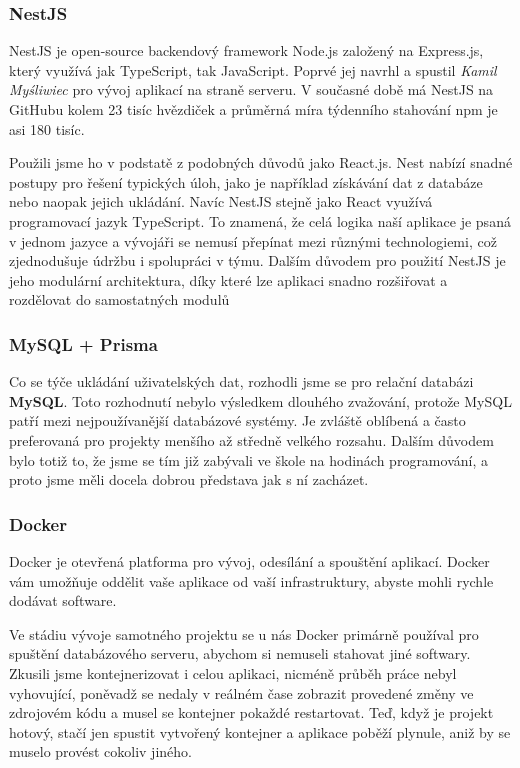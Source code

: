 \subsubsection{NestJS}
NestJS je open-source backendový framework Node.js založený na Express.js, který využívá jak TypeScript, tak JavaScript. Poprvé jej navrhl a spustil \textit{Kamil Myśliwiec} pro vývoj aplikací na straně serveru. V současné době má NestJS na GitHubu kolem 23 tisíc hvězdiček a průměrná míra týdenního stahování npm je asi 180 tisíc. \cite{nestjs_definition}

Použili jsme ho v podstatě z podobných důvodů jako React.js. Nest nabízí snadné postupy pro řešení typických úloh, jako je například získávání dat z databáze nebo naopak jejich ukládání. Navíc NestJS stejně jako React využívá programovací jazyk TypeScript. To znamená, že celá logika naší aplikace je psaná v jednom jazyce a vývojáři se nemusí přepínat mezi různými technologiemi, což zjednodušuje údržbu i spolupráci v týmu. Dalším důvodem pro použití NestJS je jeho modulární architektura, díky které lze aplikaci snadno rozšiřovat a rozdělovat do samostatných modulů

\subsubsection{MySQL + Prisma}
Co se týče ukládání uživatelských dat, rozhodli jsme se pro relační databázi \textbf{MySQL}. Toto rozhodnutí nebylo výsledkem dlouhého zvažování, protože MySQL patří mezi nejpoužívanější databázové systémy. Je zvláště oblíbená a často preferovaná pro projekty menšího až středně velkého rozsahu. Dalším důvodem bylo totiž to, že jsme se tím již zabývali ve škole na hodinách programování, a proto jsme měli docela dobrou představa jak s ní zacházet.

\subsubsection{Docker}
Docker je otevřená platforma pro vývoj, odesílání a spouštění aplikací. Docker vám umožňuje oddělit vaše aplikace od vaší infrastruktury, abyste mohli rychle dodávat software. \cite{docker_docs}

Ve stádiu vývoje samotného projektu se u nás Docker primárně používal pro spuštění databázového serveru, abychom si nemuseli stahovat jiné softwary. Zkusili jsme kontejnerizovat i celou aplikaci, nicméně průběh práce nebyl vyhovující, poněvadž se nedaly v reálném čase zobrazit provedené změny ve zdrojovém kódu a musel se kontejner pokaždé restartovat. Teď, když je projekt hotový, stačí jen spustit vytvořený kontejner a aplikace poběží plynule, aniž by se muselo provést cokoliv jiného.

